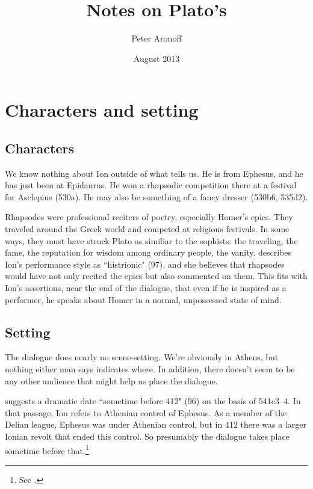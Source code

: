\documentclass[11pt]{article}
\begin{document}
\begin{titlepage}
\title{Notes on Plato's }
\author{Peter Aronoff}
\date{August 2013}
\maketitle
\thispagestyle{empty}
\end{titlepage}

\section{Characters and setting}

\subsection{Characters}

We know nothing about Ion outside of what  tells us.  He is from
Ephesus, and he has just been at Epidaurus.  He won a rhapsodic competition
there at a festival for Asclepius (530a).  He may also be something of
a fancy dresser (530b6, 535d2).

Rhapsodes were professional reciters of poetry, especially Homer's epics.
They traveled around the Greek world and competed at religious festivals.
In some ways, they must have struck Plato as similiar to the sophists: the
traveling, the fame, the reputation for wisdom among ordinary people, the
vanity.  \citet{murray1996} describes Ion's performance style as
``histrionic" (97), and she believes that rhapsodes would have not only
recited the epics but also commented on them.  This fits with Ion's
assertions, near the end of the dialogue, that even if he is inspired as
a performer, he speaks about Homer in a normal, unpossessed state of mind.


\subsection{Setting}

The dialogue does nearly no scene-setting.  We're obviously in Athens, but
nothing either man says indicates where.  In addition, there doesn't seem
to be any other audience that might help us place the dialogue.

\citet{murray1996} suggests a dramatic date ``sometime before 412" (96) on
the basis of 541c3--4.  In that passage, Ion refers to Athenian control of
Ephesus.  As a member of the Delian league, Ephesus was under Athenian
control, but in 412 there was a larger Ionian revolt that ended this
control.  So presumably the dialogue takes place sometime before
that.\footnote{See \citet{moore1974}.}
\end{document}
